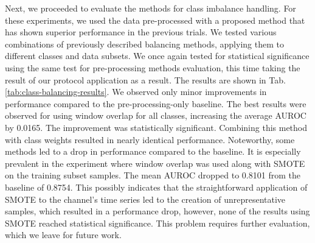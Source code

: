 \documentclass[a4paper,fleqn]{cas-sc}
\begin{document}
Next, we proceeded to evaluate the methods for class imbalance handling. For these experiments, we used the data pre-processed with a proposed method that has shown superior performance in the previous trials. We tested various combinations of previously described balancing methods, applying them to different classes and data subsets. We once again tested for statistical significance using the same test for pre-processing methods evaluation, this time taking the result of our protocol application as a result. The results are shown in Tab. \ref{tab:class-balancing-results}. We observed only minor improvements in performance compared to the pre-processing-only baseline. The best results were observed for using window overlap for all classes, increasing the average AUROC by 0.0165. The improvement was statistically significant. Combining this method with class weights resulted in nearly identical performance. Noteworthy, some methods led to a drop in performance compared to the baseline. It is especially prevalent in the experiment where window overlap was used along with SMOTE on the training subset samples. The mean AUROC dropped to 0.8101 from the baseline of 0.8754. This possibly indicates that the straightforward application of SMOTE to the channel's time series led to the creation of unrepresentative samples, which resulted in a performance drop, however, none of the results using SMOTE reached statistical significance. This problem requires further evaluation, which we leave for future work.
\end{document}
